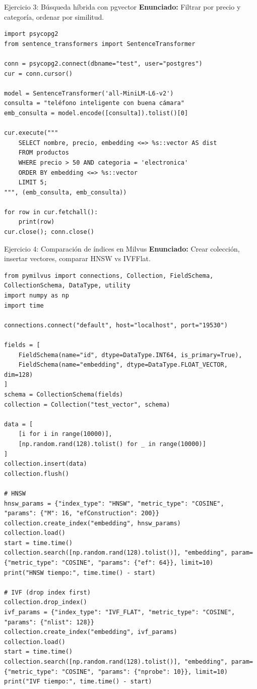 \documentclass[aspectratio=169, 10pt, xcolor=table]{beamer}
\begin{document}
\begin{frame}[fragile]{Ejercicio 3: Búsqueda híbrida con pgvector}
    \textbf{Enunciado:} Filtrar por precio y categoría, ordenar por similitud.
    \begin{lstlisting}[style=python]
import psycopg2
from sentence_transformers import SentenceTransformer

conn = psycopg2.connect(dbname="test", user="postgres")
cur = conn.cursor()

model = SentenceTransformer('all-MiniLM-L6-v2')
consulta = "teléfono inteligente con buena cámara"
emb_consulta = model.encode([consulta]).tolist()[0]

cur.execute("""
    SELECT nombre, precio, embedding <=> %s::vector AS dist
    FROM productos
    WHERE precio > 50 AND categoria = 'electronica'
    ORDER BY embedding <=> %s::vector
    LIMIT 5;
""", (emb_consulta, emb_consulta))

for row in cur.fetchall():
    print(row)
cur.close(); conn.close()
    \end{lstlisting}
\end{frame}

\begin{frame}[fragile]{Ejercicio 4: Comparación de índices en Milvus}
    \textbf{Enunciado:} Crear colección, insertar vectores, comparar HNSW vs IVFFlat.
    \begin{lstlisting}[style=python]
from pymilvus import connections, Collection, FieldSchema, CollectionSchema, DataType, utility
import numpy as np
import time

connections.connect("default", host="localhost", port="19530")

fields = [
    FieldSchema(name="id", dtype=DataType.INT64, is_primary=True),
    FieldSchema(name="embedding", dtype=DataType.FLOAT_VECTOR, dim=128)
]
schema = CollectionSchema(fields)
collection = Collection("test_vector", schema)

data = [
    [i for i in range(10000)],
    [np.random.rand(128).tolist() for _ in range(10000)]
]
collection.insert(data)
collection.flush()

# HNSW
hnsw_params = {"index_type": "HNSW", "metric_type": "COSINE", "params": {"M": 16, "efConstruction": 200}}
collection.create_index("embedding", hnsw_params)
collection.load()
start = time.time()
collection.search([np.random.rand(128).tolist()], "embedding", param={"metric_type": "COSINE", "params": {"ef": 64}}, limit=10)
print("HNSW tiempo:", time.time() - start)

# IVF (drop index first)
collection.drop_index()
ivf_params = {"index_type": "IVF_FLAT", "metric_type": "COSINE", "params": {"nlist": 128}}
collection.create_index("embedding", ivf_params)
collection.load()
start = time.time()
collection.search([np.random.rand(128).tolist()], "embedding", param={"metric_type": "COSINE", "params": {"nprobe": 10}}, limit=10)
print("IVF tiempo:", time.time() - start)
    \end{lstlisting}
\end{frame}
\end{document}
